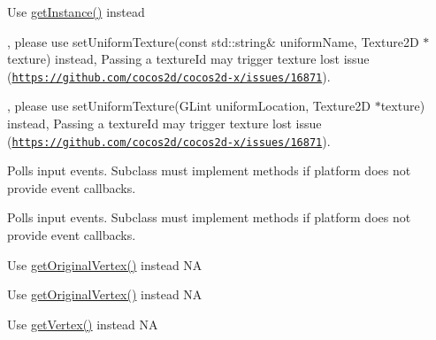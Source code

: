 \begin{DoxyRefList}
Use \hyperlink{classGLProgramCache_a084359da301355ed6c32b12689669d37}{get\+Instance()} instead  
\item[\label{deprecated__deprecated000366}%
\Hypertarget{deprecated__deprecated000366}%
Member \hyperlink{classGLProgramState_a222f78e49e5e4531a986a691f81394d1}{G\+L\+Program\+State\+:\+:set\+Uniform\+Texture} (const std\+::string \&uniform\+Name, G\+Luint texture\+Id)], please use set\+Uniform\+Texture(const std\+::string\& uniform\+Name, Texture2\+D $\ast$texture) instead, Passing a {\ttfamily texture\+Id} may trigger texture lost issue (\href{https://github.com/cocos2d/cocos2d-x/issues/16871}{\tt https\+://github.\+com/cocos2d/cocos2d-\/x/issues/16871}).  
\item[\label{deprecated__deprecated000367}%
\Hypertarget{deprecated__deprecated000367}%
Member \hyperlink{classGLProgramState_a642a29610687e43ce7f9c7af0cfa0495}{G\+L\+Program\+State\+:\+:set\+Uniform\+Texture} (G\+Lint uniform\+Location, G\+Luint texture\+Id)], please use set\+Uniform\+Texture(\+G\+Lint uniform\+Location, Texture2\+D $\ast$texture) instead, Passing a {\ttfamily texture\+Id} may trigger texture lost issue (\href{https://github.com/cocos2d/cocos2d-x/issues/16871}{\tt https\+://github.\+com/cocos2d/cocos2d-\/x/issues/16871}).  
\item[\label{deprecated__deprecated000116}%
\Hypertarget{deprecated__deprecated000116}%
Member \hyperlink{classGLView_a5b93395a827f1886414a5d4186544ddb}{G\+L\+View\+:\+:poll\+Input\+Events} ()]Polls input events. Subclass must implement methods if platform does not provide event callbacks. 

Polls input events. Subclass must implement methods if platform does not provide event callbacks.  
\item[\label{deprecated__deprecated000025}%
\Hypertarget{deprecated__deprecated000025}%
Member \hyperlink{classGrid3D_a2bc02321767e3b79260f11d5c958f750}{Grid3D\+:\+:original\+Vertex} (const \hyperlink{classVec2}{Vec2} \&pos) const]Use \hyperlink{classGrid3D_a02428c7bc60ac15aa12448bb63613647}{get\+Original\+Vertex()} instead  NA 

Use \hyperlink{classGrid3D_a02428c7bc60ac15aa12448bb63613647}{get\+Original\+Vertex()} instead  NA  
\item[\label{deprecated__deprecated000024}%
\Hypertarget{deprecated__deprecated000024}%
Member \hyperlink{classGrid3D_afa1183496d0a092d1b95acc423a13514}{Grid3D\+:\+:vertex} (const \hyperlink{classVec2}{Vec2} \&pos) const]Use \hyperlink{classGrid3D_aa39962eba8aa705b6b45115ff74a0c6a}{get\+Vertex()} instead  NA 


\end{DoxyRefList}
